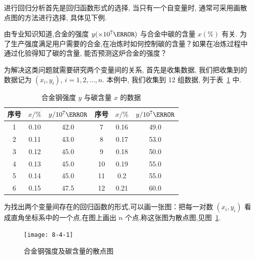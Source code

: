 进行回归分析首先是回归函数形式的选择, 当只有一个自变量时, 通常可采用画散点图的方法进行选择, 具体见下例.

\begin{example}\label{exam:8.4.1}
    由专业知识知道,合金的强度 $y(\times 10^{7}\Pa)$ 与合金中碳的含量 $x (\%)$ 有关. 为了生产强度满足用户需要的合金,在冶炼时如何控制碳的含量？如果在冶炼过程中通过化验得知了碳的含量, 能否预测这炉合金的强度？

    为解决这类问题就需要研究两个变量间的关系, 首先是收集数据, 我们把收集到的数据记为 $(x_{i}, y_{i})$, $i = 1, 2, \ldots, n$. 本例中, 我们收集到 12 组数据, 列于表~\ref{tab:8.4.1} 中.
   
    \begin{table}[htbp]
        \centering
        \caption{合金钢强度 $y$ 与碳含量 $x$ 的数据}
        \begin{tabular}{ccc|ccc}
        \toprule
        序号    &  $x /\%$  &  $y/10^{7}\Pa$  & 序号    &  $x/\%$   & $y/10^{7}\Pa$  \\
        \midrule
         1 & 0.10 & 42.0 &  7 & 0.16 & 49.0 \\
         2 & 0.11 & 43.0 &  8 & 0.17 & 53.0 \\
         3 & 0.12 & 45.0 &  9 & 0.18 & 50.0 \\
         4 & 0.13 & 45.0 & 10 & 0.19 & 55.0 \\
         5 & 0.14 & 45.0 & 11 & 0.2  & 55.0 \\
         6 & 0.15 & 47.5 & 12 & 0.21 & 60.0 \\
         \bottomrule
        \end{tabular}%
        \label{tab:8.4.1}%
    \end{table}%
    
    为找出两个变量间存在的回归函数的形式,可以画一张图：把每一对数 $(x_{i}, y_{i})$ 看成直角坐标系中的一个点,在图上画出 $n$ 个点,称这张图为散点图,见图~\ref{fig:8.4.1}.
    \begin{figure}[htbp]
        \centering
        \texttt{[image: 8-4-1]}
        \caption{合金钢强度及碳含量的散点图}
        \label{fig:8.4.1}
    \end{figure}
    

\end{example}
